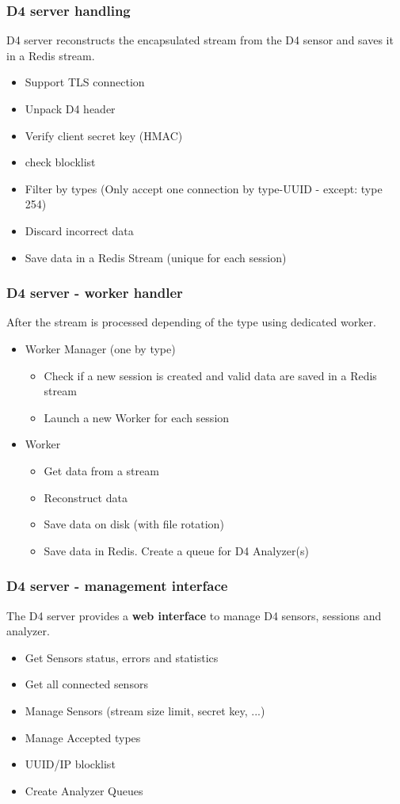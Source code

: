 \documentclass{beamer}
\begin{document}
\begin{frame}
\frametitle{D4 server handling}

D4 server reconstructs the encapsulated stream from the D4 sensor and saves it in a Redis stream.

\begin{itemize}
\item Support TLS connection
\item Unpack D4 header
\item Verify client secret key (HMAC)
\item check blocklist
\item Filter by types (Only accept one connection by type-UUID - except: type 254)
\item Discard incorrect data
\item Save data in a Redis Stream (unique for each session)
\end{itemize}
\end{frame}


\begin{frame}
        \frametitle{D4 server - worker handler}
After the stream is processed depending of the type using dedicated worker.
        \begin{itemize}
        \item Worker Manager (one by type)
                \begin{itemize}
                \item Check if a new session is created and valid data are saved in a Redis stream
                \item Launch a new Worker for each session
                \end{itemize}
        \item Worker
                \begin{itemize}
                 \item Get data from a stream
    		     \item Reconstruct data
                 \item Save data on disk (with file rotation)
                 \item Save data in Redis. Create a queue for D4 Analyzer(s)
                \end{itemize}
        \end{itemize}
\end{frame}

\begin{frame}
        \frametitle{D4 server - management interface}
The D4 server provides a {\bf web interface} to manage D4 sensors, sessions and analyzer.
        \begin{itemize}
\item Get Sensors status, errors and statistics
\item Get all connected sensors
\item Manage Sensors (stream size limit, secret key, ...)
\item Manage Accepted types
\item UUID/IP blocklist
\item  Create Analyzer Queues
        \end{itemize}
\end{frame}
\end{document}
